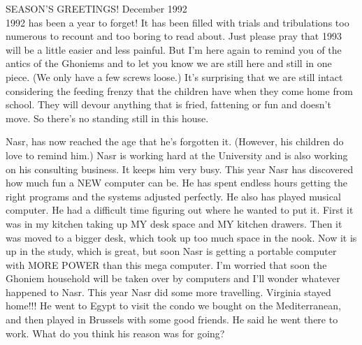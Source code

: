 
%

SEASON'S GREETINGS! \hfill December 1992\\


1992 has been a year to forget! It has been filled with trials and tribulations too numerous to recount and too boring to read about. Just
please pray that 1993 will be a little easier and less painful. But I'm here again to remind you of the antics of the Ghoniems and to let you
know we are still here and still in one piece. (We only have a few screws loose.) It's surprising that we are still intact considering the
feeding frenzy that the children have when they come home from school. They will devour anything that is fried, fattening or fun and doesn't
move. So there's no standing still in this house.

Nasr, has now reached the age that he's forgotten it. (However, his children do love to remind him.) Nasr is working hard at the University and
is also working on his consulting business. It keeps him very busy. This year Nasr has discovered how much fun a NEW computer can be. He has
spent endless hours getting the right programs and the systems adjusted perfectly. He also has played musical computer. He had a difficult time
figuring out where he wanted to put it. First it was in my kitchen taking up MY desk space and MY kitchen drawers. Then it was moved to a bigger
desk, which took up too much space in the nook. Now it is up in the study, which is great, but soon Nasr is getting a portable computer with
MORE POWER than this mega computer. I'm worried that soon the Ghoniem household will be taken over by computers and I'll wonder whatever
happened to Nasr. This year Nasr did some more travelling. Virginia stayed home!!! He went to Egypt to visit the condo we bought on the
Mediterranean, and then played in Brussels with some good friends. He said he went there to work. What do you think his reason was for going?

